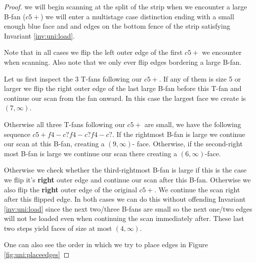 \begin{proof}
  we will begin scanning at the split of the strip when we encounter a large B-fan ($c5+$) we  will enter a multistage case distinction ending with a small enough blue face and and edges on the bottom fence of the strip satisfying Invariant \ref{inv:uni:load}.

  Note that in all cases we flip the left outer edge of the first $c5+$ we encounter when scanning. Also note that we only ever flip edges bordering a large B-fan.


  Let us first inspect the 3 T-fans following our $c5+$. If any of them is size 5 or larger we flip the right outer edge of the last large B-fan before this T-fan and continue our scan from the fan onward. In this case the largest face we create is $(7, \infty)$.

  Otherwise all three T-fans following our $c5+$ are small, we have the following sequence $c5+ f4- c? f4- c? f4- c?$. If the rightmost B-fan is large we continue our scan at this B-fan, creating a $(9, \infty)$- face. Otherwise, if the second-right most B-fan is large we continue our scan there creating a $(6, \infty)$-face.

  Otherwise we check whether the third-rightmost B-fan is large if this is the case we flip it's \textbf{right} outer edge and continue our scan after this B-fan. Otherwise we also flip the \textbf{right} outer edge of the original $c5+$. We continue the scan right after this flipped edge. In both cases we can do this without offending Invariant \ref{inv:uni:load} since the next two/three B-fans are small so the next one/two edges will not be loaded even when continuing the scan immediately after. These last two steps yield faces of size at most $(4, \infty)$.

  One can also see the order in which we try to place edges in Figure \ref{fig:uni:placeedges}


\end{proof}
